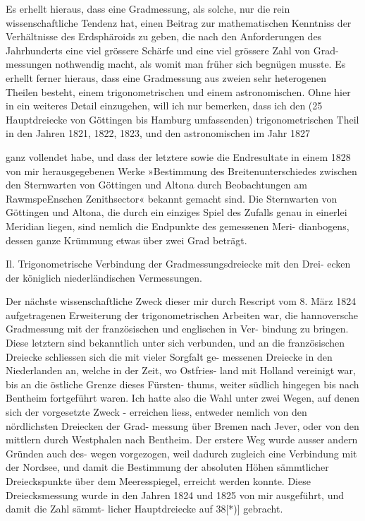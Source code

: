 \documentclass[12pt,a4paper]{article}
\theoremstyle{plain}
\theoremstyle{definition}
\theoremstyle{remark}
\begin{document}
\noindent
Es erhellt hieraus, dass eine Gradmessung, als solche, nur die rein
wissenschaftliche Tendenz hat, einen Beitrag zur mathematischen Kenntniss
der Verhältnisse des Erdsphäroids zu geben, die nach den Anforderungen des
Jahrhunderts eine viel grössere Schärfe und eine viel grössere Zahl von Grad-
messungen nothwendig macht, als womit man früher sich begnügen musste.
Es erhellt ferner hieraus, dass eine Gradmessung aus zweien sehr heterogenen
Theilen besteht, einem trigonometrischen und einem astronomischen. Ohne
hier in ein weiteres Detail einzugehen, will ich nur bemerken, dass ich den
(25 Hauptdreiecke von Göttingen bis Hamburg umfassenden) trigonometrischen
Theil in den Jahren 1821, 1822, 1823, und den astronomischen im Jahr 1827

\noindent

\noindent
ganz vollendet habe, und dass der letztere sowie die Endresultate in einem
1828 von mir herausgegebenen Werke »Bestimmung des Breitenunterschiedes
zwischen den Sternwarten von Göttingen und Altona durch Beobachtungen
am RawmspeEnschen Zenithsector« bekannt gemacht sind. Die Sternwarten von
Göttingen und Altona, die durch ein einziges Spiel des Zufalls genau in
einerlei Meridian liegen, sind nemlich die Endpunkte des gemessenen Meri-
dianbogens, dessen ganze Krümmung etwas über zwei Grad beträgt.

\noindent
Il. Trigonometrische Verbindung der Gradmessungsdreiecke mit den Drei-
ecken der königlich niederländischen Vermessungen.

\noindent
Der nächste wissenschaftliche Zweck dieser mir durch Rescript vom
8. März 1824 aufgetragenen Erweiterung der trigonometrischen Arbeiten war,
die hannoversche Gradmessung mit der französischen und englischen in Ver-
bindung zu bringen. Diese letztern sind bekanntlich unter sich verbunden,
und an die französischen Dreiecke schliessen sich die mit vieler Sorgfalt ge-
messenen Dreiecke in den Niederlanden an, welche in der Zeit, wo Ostfries-
land mit Holland vereinigt war, bis an die östliche Grenze dieses Fürsten-
thums, weiter südlich hingegen bis nach Bentheim fortgeführt waren. Ich
hatte also die Wahl unter zwei Wegen, auf denen sich der vorgesetzte Zweck
- erreichen liess, entweder nemlich von den nördlichsten Dreiecken der Grad-
messung über Bremen nach Jever, oder von den mittlern durch Westphalen
nach Bentheim. Der erstere Weg wurde ausser andern Gründen auch des-
wegen vorgezogen, weil dadurch zugleich eine Verbindung mit der Nordsee,
und damit die Bestimmung der absoluten Höhen sämmtlicher Dreieckspunkte
über dem Meeresspiegel, erreicht werden konnte. Diese Dreiecksmessung wurde
in den Jahren 1824 und 1825 von mir ausgeführt, und damit die Zahl sämmt-
licher Hauptdreiecke auf 38[*)] gebracht.
\end{document}
